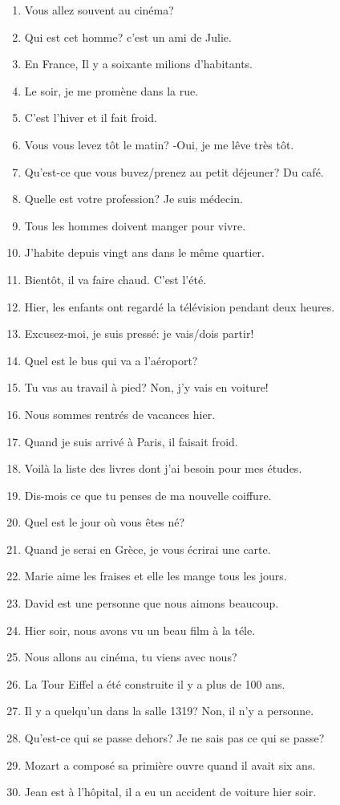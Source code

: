 \documentclass{article}
\begin{document}
\begin{enumerate}
    \item Vous allez souvent au cinéma?
    \item Qui est cet homme? c'est un ami de Julie.
    \item En France, Il y a soixante milions d'habitants.
    \item Le soir, je me promène dans la rue.
    \item C'est l'hiver et il fait froid.
    \item Vous vous levez tôt le matin? -Oui, je me lêve très tôt.
    \item Qu'est-ce que vous buvez/prenez au petit déjeuner? Du café.
    \item Quelle est votre profession? Je suis médecin.
    \item Tous les hommes doivent manger pour vivre.
    \item J'habite depuis vingt ans dans le même quartier.
    \item Bientôt, il va faire chaud. C'est l'été.
    \item Hier, les enfants ont regardé la télévision pendant deux heures.
    \item Excusez-moi, je suis pressé: je vais/dois partir!
    \item Quel est le bus qui va a l'aéroport?
    \item Tu vas au travail à pied? Non, j'y vais en voiture!
    \item Nous sommes rentrés de vacances hier.
    \item Quand je suis arrivé à Paris, il faisait froid.
    \item Voilà la liste des livres dont j'ai besoin pour mes études.
    \item Dis-mois ce que tu penses de ma nouvelle coiffure.
    \item Quel est le jour où vous êtes né?
    \item Quand je serai en Grèce, je vous écrirai une carte.
    \item Marie aime les fraises et elle les mange tous les jours.
    \item David est une personne que nous aimons beaucoup.
    \item Hier soir, nous avons vu un beau film à la téle.
    \item Nous allons au cinéma, tu viens avec nous?
    \item La Tour Eiffel a été construite il y a plus de 100 ans.
    \item Il y a quelqu'un dans la salle 1319? Non, il n'y a personne.
    \item Qu'est-ce qui se passe dehors? Je ne sais pas ce qui se passe?
    \item Mozart a composé sa primière ouvre quand il avait six ans.
    \item Jean est à l'hôpital, il a eu un accident de voiture hier soir.
\end{enumerate}
\end{document}
